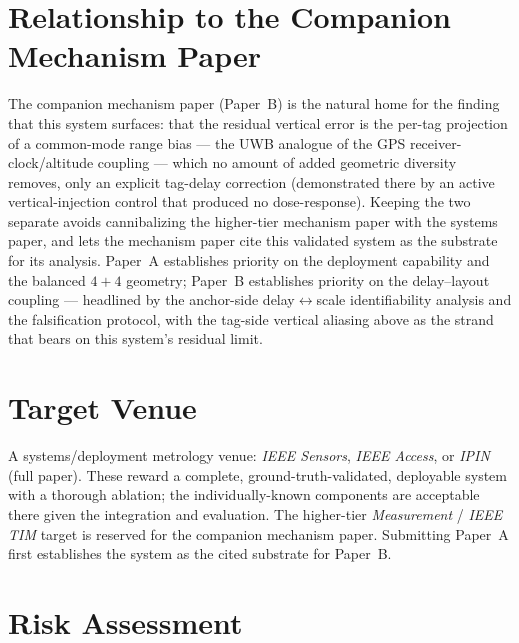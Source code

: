 \documentclass[11pt,a4paper]{article}
\begin{document}
\section{Relationship to the Companion Mechanism Paper}

The companion mechanism paper (Paper~B) is the natural home for the finding that this system
surfaces: that the residual vertical error is the per-tag projection of a common-mode range bias ---
the UWB analogue of the GPS receiver-clock/altitude coupling --- which no amount of added geometric
diversity removes, only an explicit tag-delay correction (demonstrated there by an active vertical-injection control that produced no dose-response). Keeping the two
separate avoids cannibalizing the higher-tier mechanism paper with the systems paper, and lets the
mechanism paper cite this validated system as the substrate for its analysis. Paper~A establishes
priority on the deployment capability and the balanced $4{+}4$ geometry; Paper~B establishes
priority on the delay--layout coupling --- headlined by the anchor-side delay$\leftrightarrow$scale
identifiability analysis and the falsification protocol, with the tag-side vertical aliasing above as
the strand that bears on this system's residual limit.

\section{Target Venue}

A systems/deployment metrology venue: \emph{IEEE Sensors}, \emph{IEEE Access}, or \emph{IPIN}
(full paper). These reward a complete, ground-truth-validated, deployable system with a thorough
ablation; the individually-known components are acceptable there given the integration and
evaluation. The higher-tier \emph{Measurement} / \emph{IEEE TIM} target is reserved for the
companion mechanism paper. Submitting Paper~A first establishes the system as the cited substrate
for Paper~B.

\section{Risk Assessment}
\end{document}
